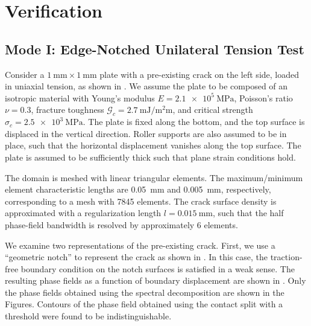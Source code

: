 \section{Verification}
\label{section: Chapter4/verification}

\subsection{Mode I: Edge-Notched Unilateral Tension Test}
Consider a $\SI{1}{\milli\meter} \times \SI{1}{\milli\meter}$ plate with a pre-existing crack on the left side, loaded in uniaxial tension, as shown in . We assume the plate to be composed of an isotropic material with Young's modulus $E = \SI{2.1e5}{\mega\pascal}$, Poisson's ratio $\nu = 0.3$, fracture toughness $\mathcal{G}_c = \SI{2.7}{\milli\joule\per\square\milli\meter}$, and critical strength $\sigma_c = \SI{2.5e3}{\mega\pascal}$.
The plate is fixed along the bottom, and the top surface is displaced in the vertical direction.  Roller supports are also assumed to be in place, such that the horizontal displacement vanishes along the top surface. The plate is assumed to be sufficiently thick such that plane strain conditions hold.

The domain is meshed with linear triangular elements.
The maximum/minimum element characteristic lengths are \SI{0.05}{\milli\meter} and \SI{0.005}{\milli\meter}, respectively, corresponding to a mesh with 7845  elements. The crack surface density is approximated with a regularization length $l = \SI{0.015}{\milli\meter}$, such that the half phase-field bandwidth is resolved by approximately 6 elements.



We examine two representations of the pre-existing crack. First, we use a ``geometric notch'' to represent the crack as shown in . In this case, the traction-free boundary condition on the notch surfaces is satisfied in a weak sense.
The resulting phase fields as a function of boundary displacement are shown in .
Only the phase fields obtained using the spectral decomposition are shown in the Figures.  Contours of the phase field obtained using the contact split with a threshold were found to be indistinguishable.


